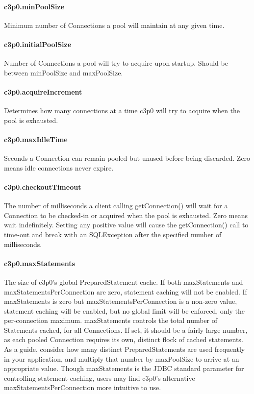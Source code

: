 \documentclass[12pt,a4paper]{report}
\begin{document}
\paragraph{c3p0.minPoolSize}
Minimum number of Connections a pool will maintain at any given time.

\paragraph{c3p0.initialPoolSize}
Number of Connections a pool will try to acquire upon startup. Should be between
minPoolSize and maxPoolSize.

\paragraph{c3p0.acquireIncrement}
Determines how many connections at a time c3p0 will try to acquire when the pool
is exhausted.

\paragraph{c3p0.maxIdleTime}
Seconds a Connection can remain pooled but unused before being discarded. Zero
means idle connections never expire.

\paragraph{c3p0.checkoutTimeout}
The number of milliseconds a client calling getConnection() will wait for a Connection
to be checked-in or acquired when the pool is exhausted. Zero means wait indefinitely.
Setting any positive value will cause the getConnection() call to time-out and
break with an SQLException after the specified number of milliseconds.

\paragraph{c3p0.maxStatements}
The size of c3p0's global PreparedStatement cache. If both maxStatements and
maxStatementsPerConnection are zero, statement caching will not be enabled.
If maxStatements is zero but maxStatementsPerConnection is a non-zero value,
statement caching will be enabled, but no global limit will be enforced, only
the per-connection maximum. maxStatements controls the total number of Statements
cached, for all Connections. If set, it should be a fairly large number, as each
pooled Connection requires its own, distinct flock of cached statements. As a guide,
consider how many distinct PreparedStatements are used frequently in your application,
and multiply that number by maxPoolSize to arrive at an appropriate value. Though
maxStatements is the JDBC standard parameter for controlling statement caching,
users may find c3p0's alternative maxStatementsPerConnection more intuitive to use.
\end{document}
